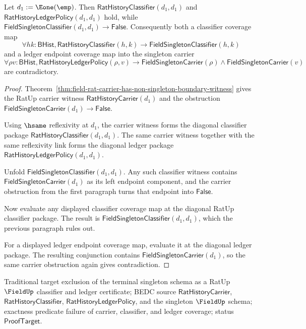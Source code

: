 \begin{theorem}
\label{thm:field-rat-classifier-ledger-singleton-empty-coverage-obstruction}
Let $d_1:=\Eone(\emp)$. Then
$\mathsf{RatHistoryClassifier}(d_1,d_1)$ and
$\mathsf{RatHistoryLedgerPolicy}(d_1,d_1)$ hold, while
$\mathsf{FieldSingletonClassifier}(d_1,d_1)\to\mathsf{False}$.
Consequently both a classifier coverage map
$$
\forall h k:\mathsf{BHist},\mathsf{RatHistoryClassifier}(h,k)\to
\mathsf{FieldSingletonClassifier}(h,k)
$$
and a ledger endpoint coverage map into the singleton carrier
$$
\forall \rho v:\mathsf{BHist},\mathsf{RatHistoryLedgerPolicy}(\rho,v)\to
\mathsf{FieldSingletonCarrier}(\rho)\land
\mathsf{FieldSingletonCarrier}(v)
$$
are contradictory.
\end{theorem}
\begin{proof}
Theorem~\ref{thm:field-rat-carrier-has-non-singleton-boundary-witness}
gives the RatUp carrier witness $\mathsf{RatHistoryCarrier}(d_1)$ and the
obstruction $\mathsf{FieldSingletonCarrier}(d_1)\to\mathsf{False}$.

Using $\hsame$ reflexivity at $d_1$, the carrier witness forms the diagonal
classifier package
$\mathsf{RatHistoryClassifier}(d_1,d_1)$. The same carrier witness together
with the same reflexivity link forms the diagonal ledger package
$\mathsf{RatHistoryLedgerPolicy}(d_1,d_1)$.

Unfold $\mathsf{FieldSingletonClassifier}(d_1,d_1)$. Any such classifier
witness contains $\mathsf{FieldSingletonCarrier}(d_1)$ as its left endpoint
component, and the carrier obstruction from the first paragraph turns that
endpoint into $\mathsf{False}$.

Now evaluate any displayed classifier coverage map at the diagonal RatUp
classifier package. The result is
$\mathsf{FieldSingletonClassifier}(d_1,d_1)$, which the previous paragraph
rules out.

For a displayed ledger endpoint coverage map, evaluate it at the diagonal ledger
package. The resulting conjunction contains
$\mathsf{FieldSingletonCarrier}(d_1)$, so the same carrier obstruction
again gives contradiction.
\end{proof}

Traditional target exclusion of the terminal singleton schema as a RatUp
$\FieldUp$ classifier and ledger certificate; BEDC source
$\mathsf{RatHistoryCarrier}$, $\mathsf{RatHistoryClassifier}$,
$\mathsf{RatHistoryLedgerPolicy}$, and the singleton $\FieldUp$ schema;
exactness predicate failure of carrier, classifier, and ledger coverage; status
$\mathsf{ProofTarget}$.


